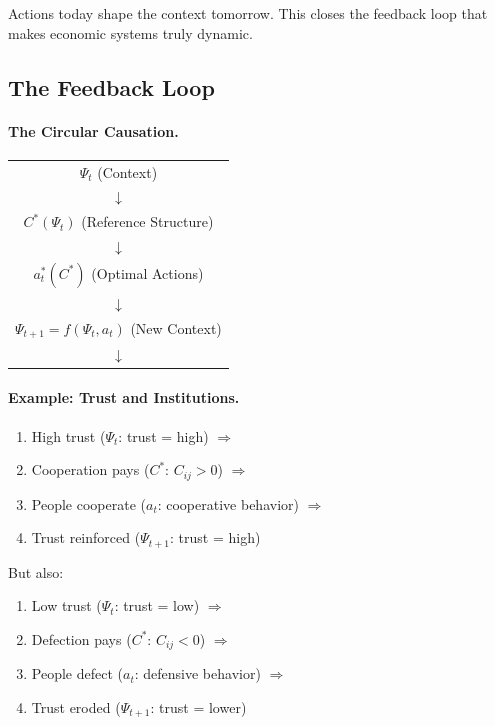 \documentclass[12pt,a4paper]{article}
\begin{document}
Actions today shape the context tomorrow.
This closes the feedback loop that makes economic systems truly dynamic.

\subsection{The Feedback Loop}

\paragraph{The Circular Causation.}
\begin{center}
\begin{tabular}{c}
$\Psi_t$ (Context) \\
$\downarrow$ \\
$C^*(\Psi_t)$ (Reference Structure) \\
$\downarrow$ \\
$a_t^*(C^*)$ (Optimal Actions) \\
$\downarrow$ \\
$\Psi_{t+1} = f(\Psi_t, a_t)$ (New Context) \\
$\downarrow$ \\
[cycle repeats]
\end{tabular}
\end{center}

\paragraph{Example: Trust and Institutions.}
\begin{enumerate}
  \item High trust ($\Psi_t$: trust = high) $\Rightarrow$
  \item Cooperation pays ($C^*$: $C_{ij} > 0$) $\Rightarrow$
  \item People cooperate ($a_t$: cooperative behavior) $\Rightarrow$
  \item Trust reinforced ($\Psi_{t+1}$: trust = high)
\end{enumerate}

But also:
\begin{enumerate}
  \item Low trust ($\Psi_t$: trust = low) $\Rightarrow$
  \item Defection pays ($C^*$: $C_{ij} < 0$) $\Rightarrow$
  \item People defect ($a_t$: defensive behavior) $\Rightarrow$
  \item Trust eroded ($\Psi_{t+1}$: trust = lower)
\end{enumerate}
\end{document}
